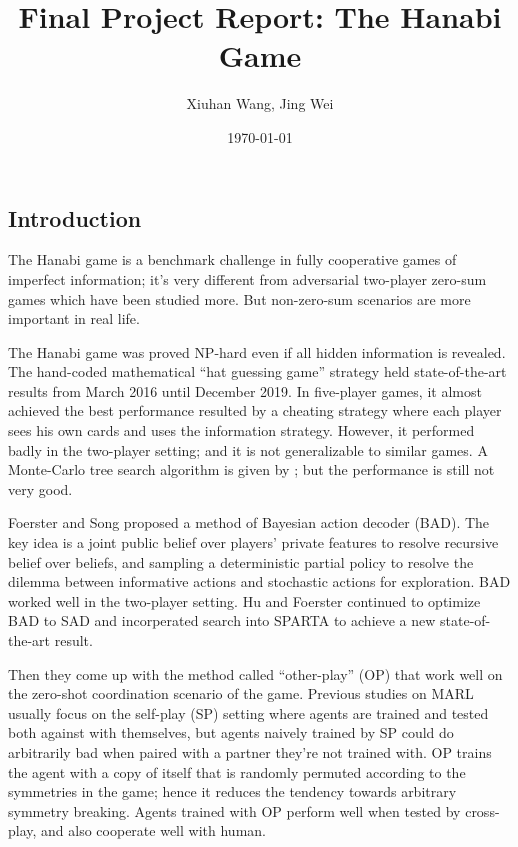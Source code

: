 \documentclass[12pt]{article}
\begin{document}
\begin{spacing}{1.15}
\title{\bf Final Project Report: The Hanabi Game}
\author{Xiuhan Wang, Jing Wei}
\date{\today}
\maketitle

\section{Introduction}
The Hanabi game is a benchmark challenge in fully cooperative games of imperfect information; it's very different from adversarial two-player zero-sum games which have been studied more\cite{bard2020the}. But non-zero-sum scenarios are more important in real life.

The Hanabi game was proved \textsf{NP}-hard even if all hidden information is revealed.\cite{baffier2017hanabi} The hand-coded mathematical ``hat guessing game'' strategy\cite{cox2015how} held state-of-the-art results from March 2016 until December 2019. In five-player games, it almost achieved the best performance resulted by a cheating strategy where each player sees his own cards and uses the information strategy. However, it performed badly in the two-player setting\cite{bouzy2017playing}; and it is not generalizable to similar games. A Monte-Carlo tree search algorithm is given by \cite{walton-rivers2017evaluating}; but the performance is still not very good.

Foerster and Song proposed a method of Bayesian action decoder (BAD)\cite{foerster2018bayesian}. The key idea is a joint public belief over players' private features to resolve recursive belief over beliefs, and sampling a deterministic partial policy to resolve the dilemma between informative actions and stochastic actions for exploration. BAD worked well in the two-player setting. Hu and Foerster continued to optimize BAD to SAD\cite{hu2020simplified} and incorperated search into SPARTA\cite{lerer2020improving} to achieve a new state-of-the-art result.

Then they come up with the method called ``other-play'' (OP)\cite{hu2020other} that work well on the zero-shot coordination scenario of the game. Previous studies on MARL usually focus on the self-play (SP) setting where agents are trained and tested both against with themselves, but agents naively trained by SP could do arbitrarily bad when paired with a partner they're not trained with. OP trains the agent with a copy of itself that is randomly permuted according to the symmetries in the game; hence it reduces the tendency towards arbitrary symmetry breaking. Agents trained with OP perform well when tested by cross-play, and also cooperate well with human.


\end{spacing}
\end{document}

